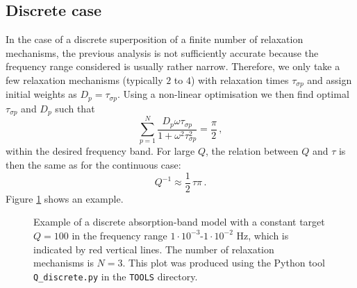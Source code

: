 \subsection{Discrete case}\label{S:Qdiscrete}

In the case of a discrete superposition of a finite number of relaxation mechanisms, the previous analysis is not sufficiently accurate because the frequency range considered is usually rather narrow. Therefore, we only take a few relaxation mechanisms (typically $2$ to $4$) with relaxation times $\tau_{\sigma p}$ and assign initial weights as $D_p=\tau_{\sigma p}$. Using a non-linear optimisation we then find optimal $\tau_{\sigma p}$ and $D_p$ such that
\begin{equation}\label{E:Qconst010}
\sum_{p=1}^{N} \frac{D_p \omega \tau_{\sigma p}}{1+\omega^2 \tau_{\sigma p}^2}=\frac{\pi}{2}\,,
\end{equation}
within the desired frequency band. For large $Q$, the relation between $Q$ and $\tau$ is then the same as for the continuous case:
\begin{equation}\label{E:Qconst011}
Q^{-1}\approx\frac{1}{2}\,\tau\pi \,.
\end{equation}
Figure \ref{F:absorption_discrete} shows an example.
\begin{center}
\begin{figure}
\center{} 
\caption{Example of a discrete absorption-band model with a constant target $Q=100$ in the frequency range $1\cdot 10^{-3}$-$1\cdot 10^{-2}$ Hz, which is indicated by red vertical lines. The number of relaxation mechanisms is $N=3$. This plot was produced using the Python tool \texttt{Q\_discrete.py} in the \texttt{TOOLS} directory.}\label{F:absorption_discrete}
\end{figure}
\end{center}

